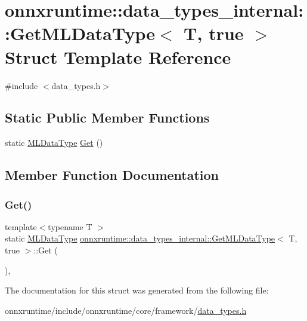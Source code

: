 \hypertarget{structonnxruntime_1_1data__types__internal_1_1GetMLDataType_3_01T_00_01true_01_4}{}\section{onnxruntime\+:\+:data\+\_\+types\+\_\+internal\+:\+:Get\+M\+L\+Data\+Type$<$ T, true $>$ Struct Template Reference}
\label{structonnxruntime_1_1data__types__internal_1_1GetMLDataType_3_01T_00_01true_01_4}


{\ttfamily \#include $<$data\+\_\+types.\+h$>$}

\subsection*{Static Public Member Functions}
\begin{DoxyCompactItemize}
\item 
static \mbox{\hyperlink{namespaceonnxruntime_ad77d0a6e838ec7da5dc35fed5ee66b49}{M\+L\+Data\+Type}} \mbox{\hyperlink{structonnxruntime_1_1data__types__internal_1_1GetMLDataType_3_01T_00_01true_01_4_a3f6525b1836ce9b8e1069f88e692df8a}{Get}} ()
\end{DoxyCompactItemize}


\subsection{Member Function Documentation}
\mbox{\label{structonnxruntime_1_1data__types__internal_1_1GetMLDataType_3_01T_00_01true_01_4_a3f6525b1836ce9b8e1069f88e692df8a}} 
\subsubsection{\texorpdfstring{Get()}{Get()}}
{\footnotesize\ttfamily template$<$typename T $>$ \\
static \mbox{\hyperlink{namespaceonnxruntime_ad77d0a6e838ec7da5dc35fed5ee66b49}{M\+L\+Data\+Type}} \mbox{\hyperlink{structonnxruntime_1_1data__types__internal_1_1GetMLDataType}{onnxruntime\+::data\+\_\+types\+\_\+internal\+::\+Get\+M\+L\+Data\+Type}}$<$ T, true $>$\+::Get (\begin{DoxyParamCaption}{ }\end{DoxyParamCaption})\hspace{0.3cm}{\ttfamily [inline]}, {\ttfamily [static]}}



The documentation for this struct was generated from the following file\+:\begin{DoxyCompactItemize}
\item 
onnxruntime/include/onnxruntime/core/framework/\mbox{\hyperlink{data__types_8h}{data\+\_\+types.\+h}}\end{DoxyCompactItemize}
